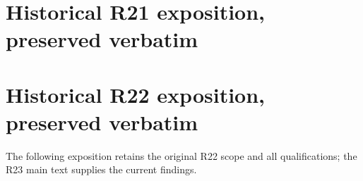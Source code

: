 \documentclass[ecta]{econsocart}
\theoremstyle{remark}
\begin{document}
\section{Historical R21 exposition, preserved verbatim}
\begingroup\let\historylabel\label\renewcommand{\label}[1]{\historylabel{historical-r21-#1}}


\endgroup
\clearpage
\section{Historical R22 exposition, preserved verbatim}
The following exposition retains the original R22 scope and all qualifications; the R23 main text supplies the current findings.
\begingroup\let\oldlabel\label\renewcommand{\label}[1]{\oldlabel{historical-r22-#1}}


\endgroup
\clearpage

\end{document}
